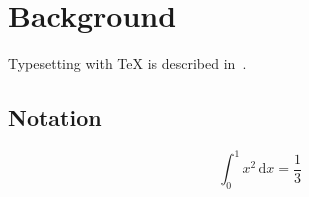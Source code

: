 \chapter{Background}
\label{ch:background}

Typesetting with \TeX{} is described in~\cite{knuth1984}.

\section{Notation}
\begin{equation}
  \int_0^1 x^2 \,\mathrm{d}x = \frac{1}{3}
\end{equation}
